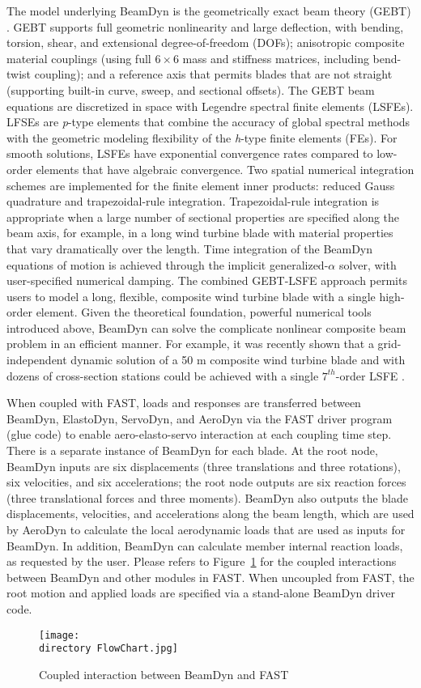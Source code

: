 The model underlying BeamDyn is the geometrically exact beam theory (GEBT) \cite{HodgesBeamBook}.   
GEBT supports full geometric nonlinearity and large deflection, with bending, torsion, shear, and extensional degree-of-freedom (DOFs); anisotropic composite material couplings (using full $6 \times 6$ mass and stiffness matrices, including bend-twist coupling); and a reference axis that permits blades that are not straight (supporting built-in curve, sweep, and sectional offsets). 
The GEBT beam equations are discretized in space with Legendre spectral finite elements (LSFEs).  
LFSEs are {\it p}-type elements that combine the accuracy of global spectral methods with the geometric modeling flexibility of the {\it h}-type finite elements (FEs). 
For smooth solutions, LSFEs have exponential convergence rates compared to low-order elements that have algebraic convergence. 
Two spatial numerical integration schemes are implemented for the finite element inner products: reduced Gauss quadrature and trapezoidal-rule integration.  
Trapezoidal-rule integration is appropriate when a large number of sectional properties are specified along the beam axis, for example, in a long wind turbine blade with material properties that vary dramatically over the length.  
Time integration of the BeamDyn equations of motion is achieved through the implicit generalized-$\alpha$ solver, with user-specified numerical damping.
The combined GEBT-LSFE  approach permits users to model a long, flexible, composite wind turbine blade with a single high-order element.  
Given the theoretical foundation, powerful numerical tools introduced above, BeamDyn can solve the complicate nonlinear composite beam problem in an efficient manner. For example, it was recently shown that a grid-independent dynamic solution of a 50 m composite wind turbine blade and with dozens of cross-section stations could be achieved with a 
single $7^{th}$-order LSFE \cite{Wang:2016}.

When coupled with FAST, loads and responses are transferred between BeamDyn, ElastoDyn, ServoDyn, and AeroDyn via the FAST driver program (glue code) to enable aero-elasto-servo interaction at each coupling time step. 
There is a separate instance of BeamDyn for each blade. 
At the root node, BeamDyn inputs are six displacements (three translations and three rotations), six velocities, and six accelerations; the root node outputs are six reaction forces (three translational forces and three moments). 
BeamDyn also outputs the blade displacements, velocities, and accelerations along the beam length, which are used by AeroDyn to calculate the local aerodynamic loads that are used as inputs for BeamDyn. 
In addition, BeamDyn can calculate member internal reaction loads, as requested by the user. 
Please refers to Figure~\ref{fig:FlowChart} for the coupled interactions between BeamDyn and other modules in FAST. 
When uncoupled from FAST, the root motion and applied loads are specified via a stand-alone BeamDyn driver code.
\begin{figure}
    \centering
    \texttt{[image: \\directory FlowChart.jpg]}
    \caption{Coupled interaction between BeamDyn and FAST}
    \label{fig:FlowChart}
\end{figure}

